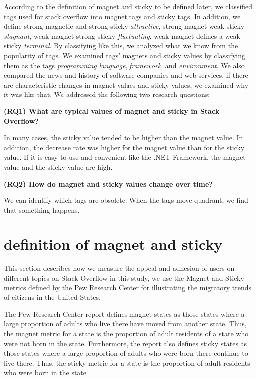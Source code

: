 \documentclass[conference]{IEEEtran}
\begin{document}
According to the definition of magnet and sticky to be defined later, we classified tags used for stack overflow into magnet tags and sticky tags. In addition, we define strong magnetic and strong sticky \emph{attractive}, strong magnet weak sticky \emph{stagnant}, weak magnet strong sticky \emph{fluctuating}, weak magnet defines a weak sticky \emph{terminal}. By classifying like this, we analyzed what we know from the popularity of tags. We examined tags' magnets and sticky values by classifying them as the tags \emph{programming language}, \emph{framework}, and \emph{environment}. We also compared the news and history of software companies and web services, if there are characteristic changes in magnet values and sticky values, we examined why it was like that. We addressed the following two research questions:
\par
\smallskip

\textbf{(RQ1) What are typical values of magnet and sticky in Stack Overflow?}\par
In many cases, the sticky value tended to be higher than the magnet value. In addition, the decrease rate was higher for the magnet value than for the sticky value. If it is easy to use and convenient like the .NET Framework, the magnet value and the sticky value are high.
\smallskip

\textbf{(RQ2) How do magnet and sticky values change over time?}\par
We can identify which tags are obsolete. When the tags move quadrant, we find that something happens.



\section{definition of magnet and sticky}
This section describes how we measure the appeal and adhesion of users on different topics on Stack Overflow in this study, we use the Magnet and Sticky metrics defined by the Pew Research Center for illustrating the migratory trends of citizens in the United States.

The Pew Research Center report defines magnet states as those states where a large proportion of adults who live there have moved from another state. Thus, the magnet metric for a state is the proportion of adult residents of a state who were not born in the state. Furthermore, the report also defines sticky states as those states where a large proportion of adults who were born there continue to live there. Thus, the sticky metric for a state is the proportion of adult residents who were born in the state
\end{document}
